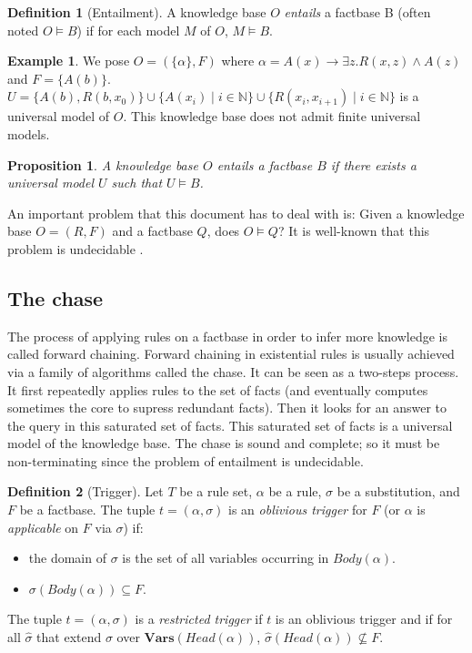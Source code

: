 \documentclass{article}
\newtheorem{proposition}{Proposition}[section]
\theoremstyle{definition}
\newtheorem{definition}{Definition}[section]
\newtheorem{example}{Example}[section]
\theoremstyle{remark}
\def \N {\mathbb N}
\newcommand{\Vars}{\textbf{Vars}}
\begin{document}
\begin{definition}[Entailment]
A knowledge base $O$ \emph{entails} a factbase B (often noted $O \models B$) if for each model $M$ of $O$, $M \models B$.
\end{definition}

\begin{example} We pose $O = (\{\alpha\},F)$ where $\alpha = A(x) \rightarrow \exists z.R(x,z) \wedge A(z)$ and $F = \{A(b)\}$. $U = \{A(b),R(b,x_0)\}\cup \{A(x_i)\mid i \in \N\}\cup \{R(x_i,x_{i+1}) \mid i \in \N\}$ is a universal model of $O$. This knowledge base does not admit finite universal models.
\end{example}


\begin{proposition}
A knowledge base $O$ entails a factbase $B$ if there exists a universal model $U$ such that $U \models B$.
\end{proposition}

An important problem that this document has to deal with is: Given a knowledge base $O=(R,F)$ and a factbase $Q$,  does $O \models Q$? It  is  well-known  that  this  problem  is  undecidable \cite{NP}. 



\subsection{The chase}

The process of applying rules on a factbase in order to infer more knowledge is called forward chaining.   Forward  chaining  in  existential  rules  is  usually achieved  via  a  family  of  algorithms  called the  chase. It can be seen as a two-steps process. It first repeatedly applies rules to the set of facts (and eventually computes sometimes the core to supress redundant facts). Then it looks for an answer to the query in this saturated set of facts. This saturated set of facts is a universal model of the knowledge base. The chase is sound and complete; so it must be non-terminating since the problem of entailment is undecidable.

\begin{definition}[Trigger]
Let $T$ be a rule set, $\alpha$ be a rule, $\sigma$ be a substitution, and $F$ be a factbase. The tuple $t = (\alpha,\sigma)$ is an \emph{oblivious trigger} for $F$ (or $\alpha$ is \emph{applicable} on $F$ via $\sigma$) if: 
\begin{itemize}
\item the domain of $\sigma$ is the set of all variables occurring in $Body(\alpha)$.
\item $\sigma(Body(\alpha)) \subseteq F$.
\end{itemize}
The tuple $t = (\alpha,\sigma)$ is a \emph{restricted trigger} if $t$ is an oblivious trigger and if for all $\hat \sigma$ that extend $\sigma$ over $\Vars(\textit{Head}(\alpha))$, $\hat \sigma(Head(\alpha)) \nsubseteq F$.

\end{definition} 
\end{document}
